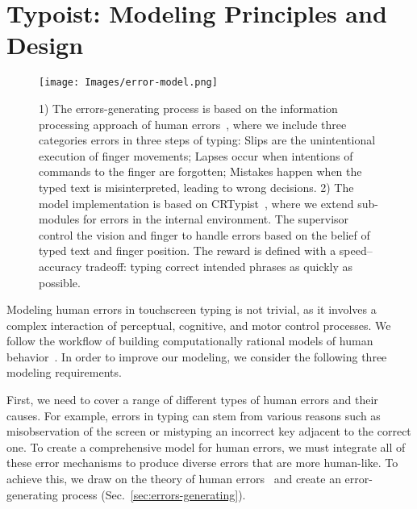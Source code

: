 \section{Typoist: Modeling Principles and Design}

\begin{figure}[!t]
\centering
  \texttt{[image: Images/error-model.png]}
  \caption{
  1) The errors-generating process is based on the information processing approach of human errors~\cite{wickens2021engineering}, where we include three categories errors in three steps of typing: Slips are the unintentional execution of finger movements; Lapses occur when intentions of commands to the finger are forgotten; Mistakes happen when the typed text is misinterpreted, leading to wrong decisions.
  2) The model implementation is based on CRTypist~\cite{shi2024crtypist}, where we extend sub-modules for errors in the internal environment. The supervisor control the vision and finger to handle errors based on the belief of typed text and finger position. The reward is defined with a speed–accuracy tradeoff: typing correct intended phrases as quickly as possible.}
  \label{fig:model}
\end{figure}


Modeling human errors in touchscreen typing is not trivial, as it involves a complex interaction of perceptual, cognitive, and motor control processes.
We follow the workflow of building computationally rational models of human behavior~\cite{chandramouli2024workflow}.
In order to improve our modeling, we consider the following three modeling requirements.

First, we need to cover a range of different types of human errors and their causes. For example, errors in typing can stem from various reasons such as misobservation of the screen or mistyping an incorrect key adjacent to the correct one. To create a comprehensive model for human errors, we must integrate all of these error mechanisms to produce diverse errors that are more human-like.
To achieve this, we draw on the theory of human errors~\cite{reason1990human} and create an error-generating process (Sec.~\ref{sec:errors-generating}).

